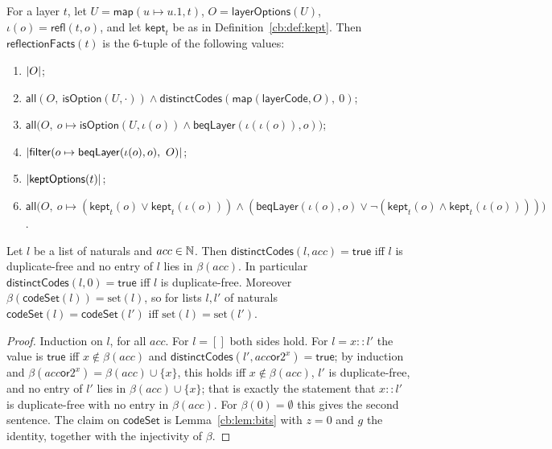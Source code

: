 \begin{definition}\label{cb:def:reflectionfacts}
For a layer $t$, let $U=\mathsf{map}(u\mapsto u.1,t)$, $O=\mathsf{layerOptions}(U)$, $\iota(o)=\mathsf{refl}(t,o)$, and
let $\mathsf{kept}_t$ be as in Definition~\ref{cb:def:kept}. Then $\mathsf{reflectionFacts}(t)$ is the $6$-tuple of
the following values:
\begin{enumerate}[label=(F\arabic*)]
\item $\lvert O\rvert$;
\item $\mathsf{all}(O,\ \mathsf{isOption}(U,\cdot))\wedge\mathsf{distinctCodes}(\mathsf{map}(\mathsf{layerCode},O),\
  0)$;
\item $\mathsf{all}\big(O,\ o\mapsto\mathsf{isOption}(U,\iota(o))\wedge\mathsf{beqLayer}(\iota(\iota(o)),o)\big)$;
\item $\card{\mathsf{filter}(o\mapsto\mathsf{beqLayer}(\iota(o),o),\ O)}$;
\item $\lvert\mathsf{keptOptions}(t)\rvert$;
\item $\mathsf{all}\big(O,\ o\mapsto(\mathsf{kept}_t(o)\vee\mathsf{kept}_t(\iota(o)))\wedge
  (\mathsf{beqLayer}(\iota(o),o)\vee\neg(\mathsf{kept}_t(o)\wedge\mathsf{kept}_t(\iota(o))))\big)$.
\end{enumerate}
\end{definition}

\begin{lemma}\label{cb:lem:codes}
Let $l$ be a list of naturals and $acc\in\mathbb N$. Then $\mathsf{distinctCodes}(l,acc)=\mathsf{true}$ iff $l$ is
duplicate-free and no entry of $l$ lies in $\beta(acc)$. In particular $\mathsf{distinctCodes}(l,0)=\mathsf{true}$ iff $l$ is
duplicate-free. Moreover $\beta(\mathsf{codeSet}(l))=\mathrm{set}(l)$, so for lists $l,l'$ of naturals
$\mathsf{codeSet}(l)=\mathsf{codeSet}(l')$ iff $\mathrm{set}(l)=\mathrm{set}(l')$.
\end{lemma}

\begin{proof}
Induction on $l$, for all $acc$. For $l=[]$ both sides hold. For $l=x\mathbin{::}l'$ the value is $\mathsf{true}$ iff
$x\notin\beta(acc)$ and $\mathsf{distinctCodes}(l',acc\mathbin{\mathsf{or}}2^x)=\mathsf{true}$; by induction and
$\beta(acc\mathbin{\mathsf{or}}2^x)=\beta(acc)\cup\{x\}$, this holds iff $x\notin\beta(acc)$, $l'$ is duplicate-free,
and no entry of $l'$ lies in $\beta(acc)\cup\{x\}$; that is exactly the statement that $x\mathbin{::}l'$ is
duplicate-free with no entry in $\beta(acc)$. For $\beta(0)=\emptyset$ this gives the second sentence. The claim on
$\mathsf{codeSet}$ is Lemma~\ref{cb:lem:bits} with $z=0$ and $g$ the identity, together with the injectivity of
$\beta$.
\end{proof}

